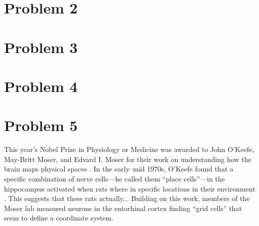 \documentclass[12pt]{article}
\begin{document}
\section{Problem 2}


\section{Problem 3}


\section{Problem 4}


\section{Problem 5}

This year's Nobel Prize in Physiology or Medicine was awarded to John O'Keefe,
May-Britt Moser, and Edvard I. Moser for their work on understanding how the
brain maps physical spaces \cite{press,nyt}.
In the early--mid 1970s, O'Keefe found that a specific combination of nerve
cells---he called them ``place cells''---in the hippocampus activated when
rats where in specific locations in their environment \cite{nobel1a, nobel1b}.
This suggests that these rats actually...
Building on this work, members of the Moser lab measured neurons in the
entorhinal cortex finding ``grid cells'' that seem to define a coordinate
system.



{}

\end{document}
